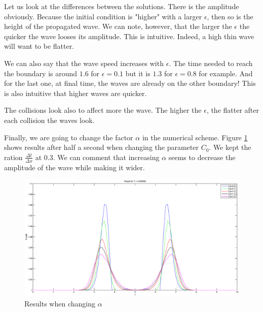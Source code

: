 Let us look at the differences between the solutions. There is the amplitude obviously. Because the initial condition is "higher" with a larger $\epsilon$, then so is the height of the propagated wave. We can note, however, that the larger the $\epsilon$ the quicker the wave looses its amplitude. This is intuitive. Indeed, a high thin wave will want to be flatter.

We can also say that the wave speed increases with $\epsilon$. The time needed to reach the boundary is around $1.6$ for $\epsilon=0.1$ but it is $1.3$ for $\epsilon=0.8$ for example. And for the last one, at final time, the waves are already on the other boundary! This is also intuitive that higher waves are quicker.

The collisions look also to affect more the wave. The higher the $\epsilon$, the flatter after each collision the waves look.

Finally, we are going to change the factor $\alpha$ in the numerical scheme. Figure \ref{alpha} shows results after half a second when changing the parameter $C_0$. We kept the ration $\frac{\Delta t}{\Delta x}$ at $0.3$. We can comment that increasing $\alpha$ seems to decrease the amplitude of the wave while making it wider.
\begin{figure}
\begin{center}
\includegraphics[scale=0.4]{alpha.eps}
\caption{Results when changing $\alpha$}
\label{alpha}
\end{center}
\end{figure}





